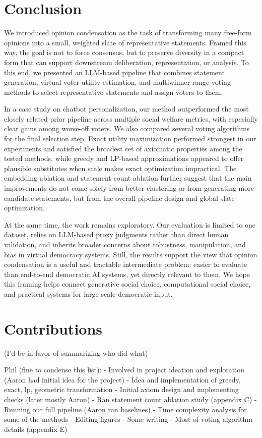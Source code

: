 \documentclass[11pt]{article}
\begin{document}
\section{Conclusion}
We introduced opinion condensation as the task of transforming many free-form opinions into a small, weighted slate of representative statements. Framed this way, the goal is not to force consensus, but to preserve diversity in a compact form that can support downstream deliberation, representation, or analysis. To this end, we presented an LLM-based pipeline that combines statement generation, virtual-voter utility estimation, and multiwinner range-voting methods to select representative statements and assign voters to them.

In a case study on chatbot personalization, our method outperformed the most closely related prior pipeline across multiple social welfare metrics, with especially clear gains among worse-off voters. We also compared several voting algorithms for the final selection step. Exact utility maximization performed strongest in our experiments and satisfied the broadest set of axiomatic properties among the tested methods, while greedy and LP-based approximations appeared to offer plausible substitutes when scale makes exact optimization impractical. The embedding ablation and statement-count ablation further suggest that the main improvements do not come solely from better clustering or from generating more candidate statements, but from the overall pipeline design and global slate optimization.

At the same time, the work remains exploratory. Our evaluation is limited to one dataset, relies on LLM-based proxy judgments rather than direct human validation, and inherits broader concerns about robustness, manipulation, and bias in virtual democracy systems. Still, the results support the view that opinion condensation is a useful and tractable intermediate problem: easier to evaluate than end-to-end democratic AI systems, yet directly relevant to them. We hope this framing helps connect generative social choice, computational social choice, and practical systems for large-scale democratic input.


\section{Contributions}

(I'd be in favor of summarizing who did what)

Phil (fine to condense this list):
- Involved in project ideation and exploration (Aaron had initial idea for the project)
- Idea and implementation of greedy, exact, lp, geometric transformation
- Initial axiom design and implementing checks (later mostly Aaron)
- Ran statement count ablation study (appendix C)
- Running our full pipeline (Aaron ran baselines)
- Time complexity analysis for some of the methods
- Editing figures
- Some writing
- Most of voting algorithm details (appendix E)
\end{document}

